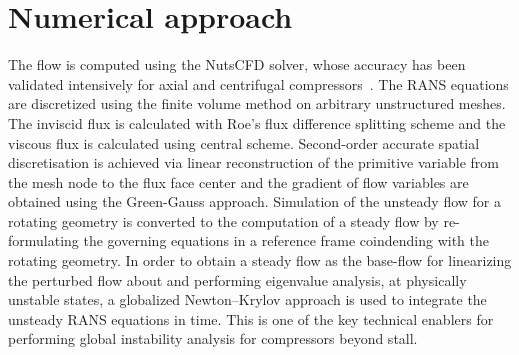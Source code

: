 \documentclass[journal,final]{new-aiaa}
\begin{document}
%



\section{Numerical approach}
\label{solver}
The flow is computed using the NutsCFD solver, whose accuracy has
been validated intensively for axial and centrifugal compressors~\cite{xu2019newton}.
The RANS equations are discretized using the finite volume method on
arbitrary unstructured meshes. The inviscid flux is calculated with Roe's
flux difference splitting scheme and the viscous flux is calculated
using central scheme. Second-order accurate spatial discretisation
is achieved via linear reconstruction of the primitive variable
from the mesh node to the flux face center and the gradient of
flow variables are obtained using the Green-Gauss approach. Simulation
of the unsteady flow for a rotating geometry is converted to the
computation of a steady flow by re-formulating the governing equations
in a reference frame coindending with the rotating geometry.
In order to obtain a steady flow as the base-flow for linearizing
the perturbed flow about and performing eigenvalue analysis, at
physically unstable states, a globalized Newton--Krylov approach
is used to integrate the unsteady RANS equations in time. This is
one of the key technical enablers for performing global instability
analysis for compressors beyond stall.
\end{document}
